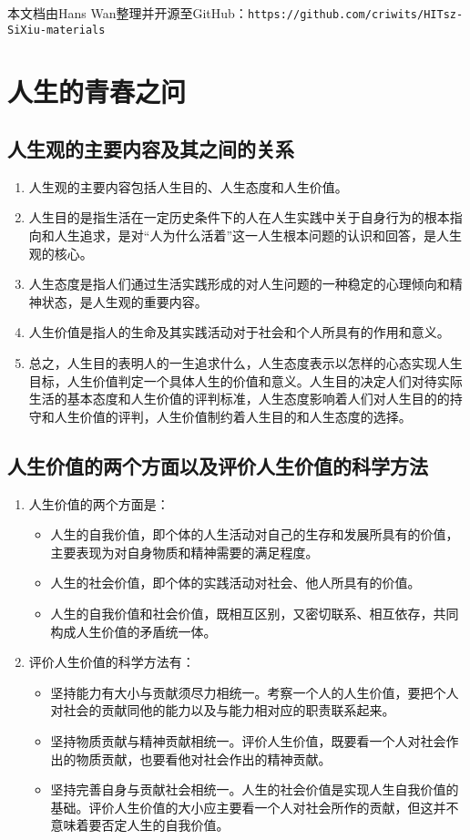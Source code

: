 \begin{center}
本文档由Hans Wan整理并开源至GitHub：\verb|https://github.com/criwits/HITsz-SiXiu-materials|
\end{center}

\section{人生的青春之问}

\subsection{人生观的主要内容及其之间的关系}
\begin{enumerate}
\item 人生观的主要内容包括人生目的、人生态度和人生价值。
\item 人生目的是指生活在一定历史条件下的人在人生实践中关于自身行为的根本指向和人生追求，是对“人为什么活着”这一人生根本问题的认识和回答，是人生观的核心。
\item 人生态度是指人们通过生活实践形成的对人生问题的一种稳定的心理倾向和精神状态，是人生观的重要内容。
\item 人生价值是指人的生命及其实践活动对于社会和个人所具有的作用和意义。
\item 总之，人生目的表明人的一生追求什么，人生态度表示以怎样的心态实现人生目标，人生价值判定一个具体人生的价值和意义。人生目的决定人们对待实际生活的基本态度和人生价值的评判标准，人生态度影响着人们对人生目的的持守和人生价值的评判，人生价值制约着人生目的和人生态度的选择。
\end{enumerate}

\subsection{人生价值的两个方面以及评价人生价值的科学方法}
\begin{enumerate}
\item 人生价值的两个方面是：
\begin{itemize}
\item 人生的自我价值，即个体的人生活动对自己的生存和发展所具有的价值，主要表现为对自身物质和精神需要的满足程度。
\item 人生的社会价值，即个体的实践活动对社会、他人所具有的价值。
\item 人生的自我价值和社会价值，既相互区别，又密切联系、相互依存，共同构成人生价值的矛盾统一体。
\end{itemize}
\item 评价人生价值的科学方法有：
\begin{itemize}
\item 坚持能力有大小与贡献须尽力相统一。考察一个人的人生价值，要把个人对社会的贡献同他的能力以及与能力相对应的职责联系起来。
\item 坚持物质贡献与精神贡献相统一。评价人生价值，既要看一个人对社会作出的物质贡献，也要看他对社会作出的精神贡献。
\item 坚持完善自身与贡献社会相统一。人生的社会价值是实现人生自我价值的基础。评价人生价值的大小应主要看一个人对社会所作的贡献，但这并不意味着要否定人生的自我价值。
\end{itemize}
\end{enumerate}

